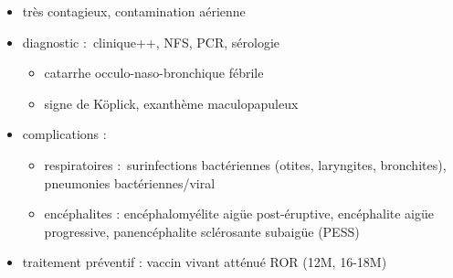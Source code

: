 \begin{itemize}
\item
  très contagieux, contamination aérienne
\item
  diagnostic :~clinique++, NFS, PCR, sérologie

  \begin{itemize}
  \item
    catarrhe occulo-naso-bronchique fébrile
  \item
    signe de Köplick, exanthème maculopapuleux
  \end{itemize}
\item
  complications :

  \begin{itemize}
  \item
    respiratoires :~surinfections bactériennes (otites, laryngites,
    bronchites), pneumonies bactériennes/viral
  \item
    encéphalites : encéphalomyélite aigüe post-éruptive, encéphalite
    aigüe progressive, panencéphalite sclérosante subaigüe (PESS)
  \end{itemize}
\item
  traitement préventif : vaccin vivant atténué ROR (12M, 16-18M)
\end{itemize}

